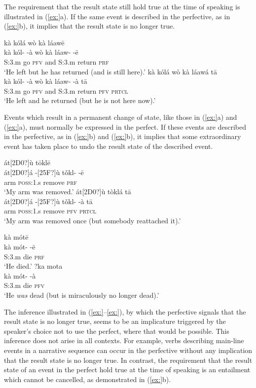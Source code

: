 The requirement that the result state still hold true at the time of speaking is illustrated in (\ref{ex:}a). If the same event is described in the perfective, as in (\ref{ex:}b), it implies that the result state is no longer true.


\ea
\ea  \glll kà  kólá    wò  kà  láawē\\
kà  kól-  -à  wò  kà  láaw-  -ē\\
S:3.m  go  \textsc{pfv}  and  S:3.m  return  \textsc{prf}\\
\glt ‘He left but he has returned (and is still here).’
\ex \glll   kà  kólá    wò  kà  láawá    tā\\
kà  kól-  -à  wò  kà  láaw-  -à  tā\\
S:3.m  go  \textsc{pfv}  and  S:3.m  return  \textsc{pfv}  \textsc{prtcl}\\
\glt ‘He left and he returned (but he is not here now).’
\z \z


Events which result in a permanent change of state, like those in (\ref{ex:}a) and (\ref{ex:}a), must normally be expressed in the perfect. If these events are described in the perfective, as in (\ref{ex:}b) and (\ref{ex:}b), it implies that some extraordinary event has taken place to undo the result state of the described event.


\ea
\ea  \glll át[2D0?]ù    tōklē\\
át[2D0?]á  -[25F?]ù  tǒkl-  -ē\\
arm  \textsc{poss}:1.s  remove  \textsc{prf}\\
\glt ‘My arm was removed.’
\ex \glll  át[2D0?]ù    tòklá    tā\\
át[2D0?]á  -[25F?]ù  tǒkl-  -à  tā\\
arm  \textsc{poss}:1.s  remove  \textsc{pfv}  \textsc{prtcl}\\
\glt ‘My arm was removed once (but somebody reattached it).’
\z \z

\ea
\ea  \glll kà  mótē\\
kà  mót-  -ē\\
S:3.m  die  \textsc{prf}\\
\glt ‘He died.’
\ex \glll ?ka  mota\\
 kà  mót-  -à\\
S:3.m  die  \textsc{pfv}\\
\glt ‘He \textit{was} dead (but is miraculously no longer dead).’
\z \z


The inference illustrated in (\ref{ex:}--\ref{ex:}), by which the perfective signals that the result state is no longer true, seems to be an implicature triggered by the speaker’s choice not to use the perfect, where that would be possible. This inference does not arise in all contexts. For example, verbs describing main-line events in a narrative sequence can occur in the perfective without any implication that the result state is no longer true. In contrast, the requirement that the result state of an event in the perfect hold true at the time of speaking is an entailment which cannot be cancelled, as demonstrated in (\ref{ex:}b).


